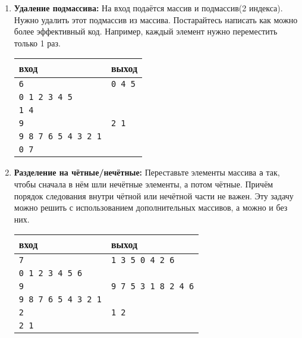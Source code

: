 \documentclass[10pt]{article}
\begin{document}
\begin{enumerate}
\item \textbf{Удаление подмассива:} На вход подаётся массив и подмассив(2 индекса). Нужно удалить этот подмассив из массива. Постарайтесь написать как можно более эффективный код. Например, каждый элемент нужно переместить только 1 раз.
\begin{center}
\begin{tabular}{ l | l }
 вход & выход \\ \hline
 \texttt{6} & \texttt{0 4 5}  \\  
 \texttt{0 1 2 3 4 5} &  \\ 
 \texttt{1 4} &   \\ \hline
 \texttt{9} & \texttt{2 1}  \\  
 \texttt{9 8 7 6 5 4 3 2 1} &  \\ 
 \texttt{0 7} &   \\
\end{tabular}
\end{center}
\item \textbf{Разделение на чётные/нечётные:} Переставьте элементы массива \texttt{a} так, чтобы сначала в нём шли нечётные элементы, а потом чётные. Причём порядок следования внутри чётной или нечётной части не важен. Эту задачу можно решить с использованием дополнительных массивов, а можно и без них.
\begin{center}
\begin{tabular}{ l | l }
 вход & выход \\ \hline
 \texttt{7} & \texttt{1 3 5 0 4 2 6}  \\  
 \texttt{0 1 2 3 4 5 6} & \\ \hline
 \texttt{9} & \texttt{9 7 5 3 1 8 2 4 6}  \\  
 \texttt{9 8 7 6 5 4 3 2 1} &  \\ \hline
 \texttt{2} & \texttt{1 2}  \\  
 \texttt{2 1} &  \\
\end{tabular}
\end{center}


\end{enumerate}
\end{document}
